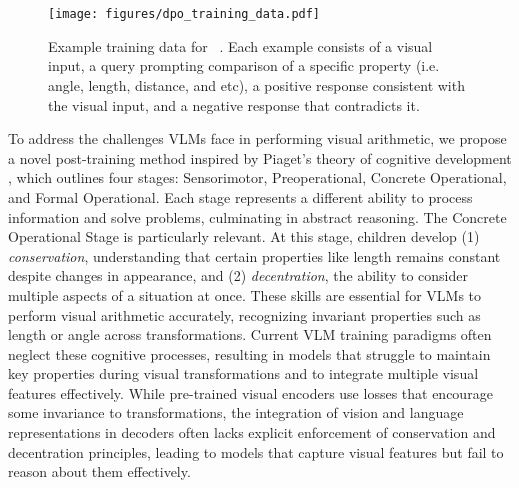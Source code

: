 \section{\method~}
\label{sec:method}


\begin{figure*}[t]
    \centering
    \texttt{[image: figures/dpo\_training\_data.pdf]}
    \vspace{-7mm}
    \caption{Example training data for \method~. Each example consists of a visual input, a query prompting comparison of a specific property (i.e. angle, length, distance, and etc), a positive response consistent with the visual input, and a negative response that contradicts it.}
    \vspace{-5mm}
    \label{fig:training_data}
\end{figure*}




To address the challenges VLMs face in performing visual arithmetic, we propose a novel post-training method inspired by Piaget's theory of cognitive development \cite{piaget1952origins}, which outlines four stages: Sensorimotor, Preoperational, Concrete Operational, and Formal Operational. Each stage represents a different ability to process information and solve problems, culminating in abstract reasoning. The Concrete Operational Stage is particularly relevant. At this stage, children develop (1) \textit{conservation}, understanding that certain properties like length remains constant despite changes in appearance, and (2) \textit{decentration}, the ability to consider multiple aspects of a situation at once. These skills are essential for VLMs to perform visual arithmetic accurately, recognizing invariant properties such as length or angle across transformations. Current VLM training paradigms often neglect these cognitive processes, resulting in models that struggle to maintain key properties during visual transformations and to integrate multiple visual features effectively. While pre-trained visual encoders use losses that encourage some invariance to transformations, the integration of vision and language representations in decoders often lacks explicit enforcement of conservation and decentration principles, leading to models that capture visual features but fail to reason about them effectively.






